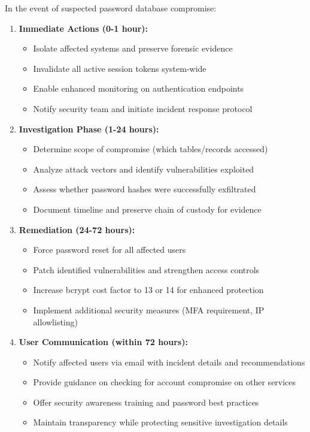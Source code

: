 \documentclass[12pt,a4paper]{article}
\begin{document}
\begin{tcolorbox}[colback=primaryblue!5, colframe=primaryblue, boxrule=1pt, arc=3pt, left=10pt, right=10pt, top=8pt, bottom=8pt]
In the event of suspected password database compromise:

\begin{enumerate}[leftmargin=2em, itemsep=6pt]
    \item \textbf{Immediate Actions (0-1 hour):}
    \begin{itemize}[leftmargin=2em, itemsep=4pt]
        \item Isolate affected systems and preserve forensic evidence
        \item Invalidate all active session tokens system-wide
        \item Enable enhanced monitoring on authentication endpoints
        \item Notify security team and initiate incident response protocol
    \end{itemize}
    
    \item \textbf{Investigation Phase (1-24 hours):}
    \begin{itemize}[leftmargin=2em, itemsep=4pt]
        \item Determine scope of compromise (which tables/records accessed)
        \item Analyze attack vectors and identify vulnerabilities exploited
        \item Assess whether password hashes were successfully exfiltrated
        \item Document timeline and preserve chain of custody for evidence
    \end{itemize}
    
    \item \textbf{Remediation (24-72 hours):}
    \begin{itemize}[leftmargin=2em, itemsep=4pt]
        \item Force password reset for all affected users
        \item Patch identified vulnerabilities and strengthen access controls
        \item Increase bcrypt cost factor to 13 or 14 for enhanced protection
        \item Implement additional security measures (MFA requirement, IP allowlisting)
    \end{itemize}
    
    \item \textbf{User Communication (within 72 hours):}
    \begin{itemize}[leftmargin=2em, itemsep=4pt]
        \item Notify affected users via email with incident details and recommendations
        \item Provide guidance on checking for account compromise on other services
        \item Offer security awareness training and password best practices
        \item Maintain transparency while protecting sensitive investigation details
    \end{itemize}
\end{enumerate}


\end{tcolorbox}
\end{document}
